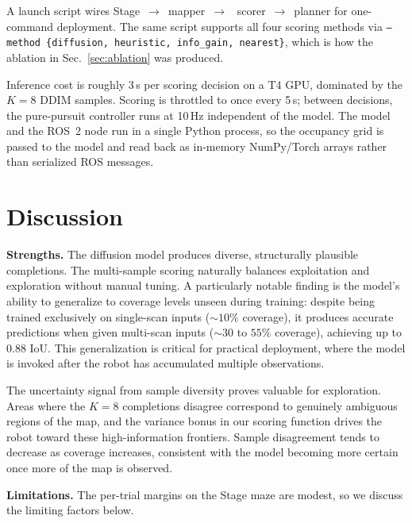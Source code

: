 \documentclass[conference]{IEEEtran}
\begin{document}
A launch script wires Stage~$\rightarrow$~mapper~$\rightarrow$~
scorer~$\rightarrow$~planner for one-command deployment. The same
script supports all four scoring methods via
\texttt{--method \{diffusion, heuristic, info\_gain, nearest\}}, which
is how the ablation in Sec.~\ref{sec:ablation} was produced.

Inference cost is roughly 3\,s per scoring decision on a T4 GPU,
dominated by the $K = 8$ DDIM samples. Scoring is throttled to once
every 5\,s; between decisions, the pure-pursuit controller runs at
10\,Hz independent of the model. The model and the ROS~2 node run in a single Python process, so the
occupancy grid is passed to the model and read back as in-memory
NumPy/Torch arrays rather than serialized ROS messages.

\section{Discussion}

\textbf{Strengths.} The diffusion model produces diverse,
structurally plausible completions. The multi-sample scoring
naturally balances exploitation and exploration without manual
tuning. A particularly notable finding is the model's ability to
generalize to coverage levels unseen during training: despite being
trained exclusively on single-scan inputs ($\sim 10\%$ coverage), it
produces accurate predictions when given multi-scan inputs
($\sim 30$ to $55\%$ coverage), achieving up to 0.88 IoU. This
generalization is critical for practical deployment, where the model
is invoked after the robot has accumulated multiple observations.

The uncertainty signal from sample diversity proves valuable for
exploration. Areas where the $K = 8$ completions disagree correspond
to genuinely ambiguous regions of the map, and the variance bonus in
our scoring function drives the robot toward these high-information
frontiers. Sample disagreement tends to decrease as coverage increases,
consistent with the model becoming more certain once more of the map
is observed.

\textbf{Limitations.} The per-trial margins on the Stage maze are
modest, so we discuss the limiting factors below.
\end{document}
